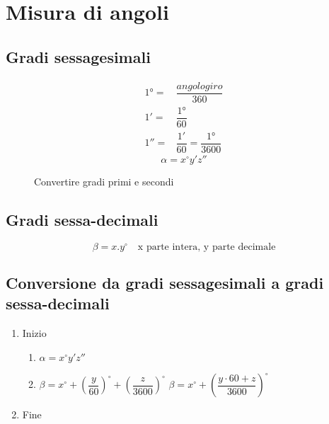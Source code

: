 \chapter{Misura di angoli}
\section{Gradi sessagesimali}
\begin{align*}
\ang{1}=&\dfrac{angolo giro}{360}\\
\ang{;1;}=&\dfrac{\ang{1}}{60}\\
\ang{;;1}=&\dfrac{\ang{;1;}}{60}=\dfrac{\ang{1}}{3600}
\end{align*}
\begin{equation*}
\alpha=x^\circ y'z''
\end{equation*}
\begin{figure} %
	\centering
	
	\caption{Convertire gradi primi e secondi}\label{fig:Convertiregradiprimisecondi}
\end{figure}
\section{Gradi sessa-decimali}
\begin{equation*}
\beta=x.y^\circ\quad\text{x parte intera, y parte decimale}
\end{equation*}
\section{Conversione da gradi sessagesimali a gradi sessa-decimali}
\begin{enumerate}
	\item Inizio
	\begin{enumerate}
		\item $\alpha=x^\circ y'z''$
		\item $\beta=x^\circ+\left(\dfrac{y}{60}\right)^\circ+\left(\dfrac{z}{3600}\right)^\circ$
		$\beta=x^\circ+\left(\dfrac{y\cdot 60 +z}{3600}\right)^\circ$
	\end{enumerate}
\item Fine
\end{enumerate}
